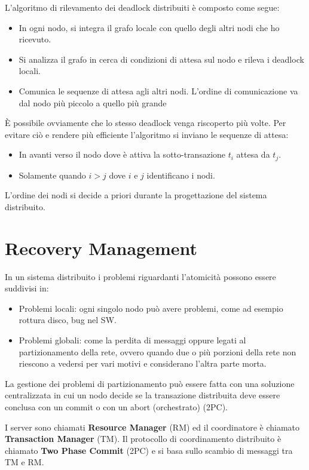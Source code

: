 L'algoritmo di rilevamento dei deadlock distribuiti è composto come segue:
\begin{itemize}
      \item In ogni nodo, si integra il grafo locale con quello degli altri nodi
            che ho ricevuto.
      \item Si analizza il grafo in cerca di condizioni di attesa sul nodo e
            rileva i deadlock locali.
      \item Comunica le sequenze di attesa agli altri nodi. L'ordine di
            comunicazione va dal nodo più piccolo a quello più grande
\end{itemize}

È possibile ovviamente che lo stesso deadlock venga riscoperto più volte. Per
evitare ciò e rendere più efficiente l'algoritmo si inviano le sequenze di attesa:
\begin{itemize}
      \item In avanti verso il nodo dove è attiva la sotto-transazione $t_i$
            attesa da $t_j$.
      \item Solamente quando $i > j$ dove $i$ e $j$ identificano i nodi.
\end{itemize}
L'ordine dei nodi si decide a priori durante la progettazione del sistema distribuito.
\section{Recovery Management}
In un sistema distribuito i problemi riguardanti l'atomicità possono essere
suddivisi in:
\begin{itemize}
      \item Problemi locali: ogni singolo nodo può avere problemi, come ad
            esempio rottura disco, bug nel SW.
      \item Problemi globali: come la perdita di messaggi oppure legati al
            partizionamento della rete, ovvero quando due o più porzioni della
            rete non riescono a vedersi per vari motivi e considerano l'altra
            parte morta.
\end{itemize}
La gestione dei problemi di partizionamento può essere fatta con una soluzione
centralizzata in cui un nodo decide se la transazione distribuita deve essere
conclusa con un commit o con un abort (orchestrato) (2PC).

I server sono chiamati \textbf{Resource Manager} (RM) ed il coordinatore è
chiamato \textbf{Transaction Manager} (TM). Il protocollo di coordinamento
distribuito è chiamato \textbf{Two Phase Commit} (2PC) e si basa sullo scambio
di messaggi tra TM e RM.


